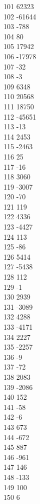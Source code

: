 { 101	62323 \\
 102	-61644 \\
 103	-788 \\
 104	80 \\
 105	17942 \\
 106	-17978 \\
 107	-32 \\
 108	-3 \\
 109	6348 \\
 110	20568 \\
 111	18750 \\
 112	-45651 \\
 113	-13 \\
 114	2453 \\
 115	-2463 \\
 116	25 \\
 117	-16 \\
 118	3060 \\
 119	-3007 \\
 120	-70 \\
 121	119 \\
 122	4336 \\
 123	-4427 \\
 124	113 \\
 125	-86 \\
 126	5414 \\
 127	-5438 \\
 128	112 \\
 129	-1 \\
 130	2939 \\
 131	-3089 \\
 132	4288 \\
 133	-4171 \\
 134	2227 \\
 135	-2257 \\
 136	-9 \\
 137	-72 \\
 138	2083 \\
 139	-2086 \\
 140	152 \\
 141	-58 \\
 142	-6 \\
 143	673 \\
 144	-672 \\
 145	887 \\
 146	-961 \\
 147	146 \\
 148	-133 \\
 149	100 \\
 150	6 \\
}
